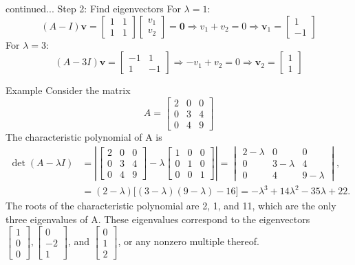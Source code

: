 \documentclass[11pt]{beamer}
\theoremstyle{plain}
\begin{document}
\begin{frame}{continued...}
    Step 2: Find eigenvectors
For $\lambda = 1$:
$$
(A - I)\mathbf{v} = \begin{bmatrix}
1 & 1 \\
1 & 1
\end{bmatrix}
\begin{bmatrix}
v_1 \\
v_2
\end{bmatrix} = \mathbf{0}
\Rightarrow v_1 + v_2 = 0
\Rightarrow \mathbf{v}_1 = \begin{bmatrix}1 \\ -1\end{bmatrix}
$$
For $\lambda = 3$:
$$
(A - 3I)\mathbf{v} = \begin{bmatrix}
-1 & 1 \\
1 & -1
\end{bmatrix}
\Rightarrow -v_1 + v_2 = 0 \Rightarrow \mathbf{v}_2 = \begin{bmatrix}1 \\ 1\end{bmatrix}
$$
\end{frame}

\begin{frame}{Example}
Consider the matrix
$$
A=\begin{bmatrix}2&0&0\\0&3&4\\0&4&9\end{bmatrix}
$$
The characteristic polynomial of A is $$\begin{aligned}\det(A-\lambda I)&=\left|{\begin{bmatrix}2&0&0\\0&3&4\\0&4&9\end{bmatrix}}-\lambda {\begin{bmatrix}1&0&0\\0&1&0\\0&0&1\end{bmatrix}}\right|={\begin{vmatrix}2-\lambda &0&0\\0&3-\lambda &4\\0&4&9-\lambda \end{vmatrix}},\\[6pt]&=(2-\lambda ){\bigl [}(3-\lambda )(9-\lambda )-16{\bigr ]}=-\lambda ^{3}+14\lambda ^{2}-35\lambda +22.\end{aligned}$$
The roots of the characteristic polynomial are 2, 1, and 11, which are the only three eigenvalues of A. These eigenvalues correspond to the eigenvectors $\begin{bmatrix}1\\0\\0\end{bmatrix},\begin{bmatrix}0\\-2\\1\end{bmatrix}$, and $\begin{bmatrix}0\\1\\2\end{bmatrix}$, or any nonzero multiple thereof.
\end{frame}
\end{document}
